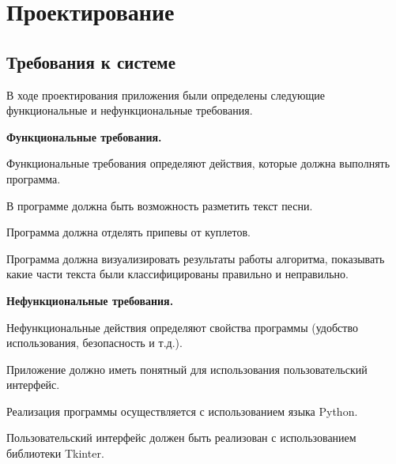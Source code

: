 \newpage
\section{Проектирование}
\label{sec:Definition}
 
\subsection{Требования к системе}
В ходе проектирования приложения были определены следующие функциональные и нефункциональные требования.

\textbf{Функциональные требования.}

Функциональные требования определяют действия, которые должна выполнять программа.
\begin{enumerateparen}
    \item В программе должна быть возможность разметить текст песни.
    \item Программа должна отделять припевы от куплетов.
    \item Программа должна визуализировать результаты работы алгоритма, показывать какие части текста были классифицированы правильно и неправильно.
\end{enumerateparen}

\textbf{Нефункциональные требования.}

Нефункциональные действия определяют свойства программы (удобство использования, безопасность и т.д.). 
\begin{enumerateparen}
    \item Приложение должно иметь понятный для использования пользовательский интерфейс.
    \item Реализация программы осуществляется с использованием языка Python.
    \item Пользовательский интерфейс должен быть реализован с использованием библиотеки Tkinter.
\end{enumerateparen}


\vspace{2em}
